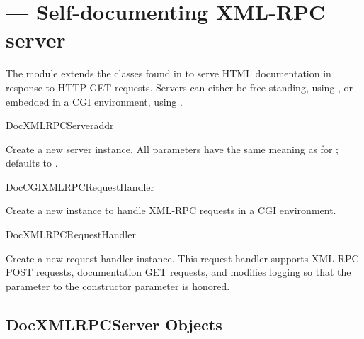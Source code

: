 \section{ ---
         Self-documenting XML-RPC server}



The  module extends the classes found in
 to serve HTML documentation in response to
HTTP GET requests. Servers can either be free standing, using
, or embedded in a CGI environment, using
.

\begin{classdesc}{DocXMLRPCServer}{addr}

Create a new server instance. All parameters have the same meaning as
for ;
 defaults to .

\end{classdesc}

\begin{classdesc}{DocCGIXMLRPCRequestHandler}{}

Create a new instance to handle XML-RPC requests in a CGI environment.

\end{classdesc}

\begin{classdesc}{DocXMLRPCRequestHandler}{}

Create a new request handler instance. This request handler supports
XML-RPC POST requests, documentation GET requests, and modifies
logging so that the  parameter to the
 constructor parameter is honored.

\end{classdesc}

\subsection{DocXMLRPCServer Objects \label{doc-xmlrpc-servers}}

